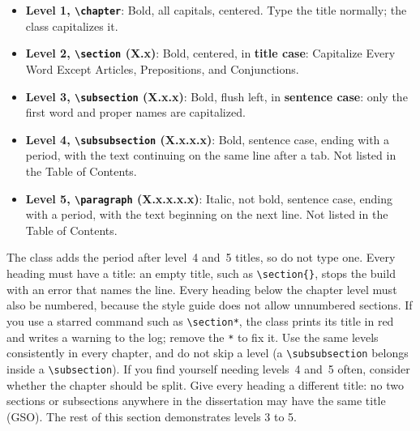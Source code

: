 \begin{itemize}
\item \textbf{Level 1, \texttt{\textbackslash chapter}}: Bold, all capitals, centered. Type the title normally; the class capitalizes it.
\item \textbf{Level 2, \texttt{\textbackslash section} (X.x)}: Bold, centered, in \textbf{title case}: Capitalize Every Word Except Articles, Prepositions, and Conjunctions.
\item \textbf{Level 3, \texttt{\textbackslash subsection} (X.x.x)}: Bold, flush left, in \textbf{sentence case}: only the first word and proper names are capitalized.
\item \textbf{Level 4, \texttt{\textbackslash subsubsection} (X.x.x.x)}: Bold, sentence case, ending with a period, with the text continuing on the same line after a tab. Not listed in the Table of Contents.
\item \textbf{Level 5, \texttt{\textbackslash paragraph} (X.x.x.x.x)}: Italic, not bold, sentence case, ending with a period, with the text beginning on the next line. Not listed in the Table of Contents.
\end{itemize}

The class adds the period after level~4 and~5 titles, so do not type one. Every heading must have a title: an empty title, such as \verb+\section{}+, stops the build with an error that names the line. Every heading below the chapter level must also be numbered, because the style guide does not allow unnumbered sections. If you use a starred command such as \verb+\section*+, the class prints its title in red and writes a warning to the log; remove the \verb+*+ to fix it. Use the same levels consistently in every chapter, and do not skip a level (a \verb+\subsubsection+ belongs inside a \verb+\subsection+). If you find yourself needing levels~4 and~5 often, consider whether the chapter should be split. Give every heading a different title: no two sections or subsections anywhere in the dissertation may have the same title (GSO). The rest of this section demonstrates levels 3 to 5.


